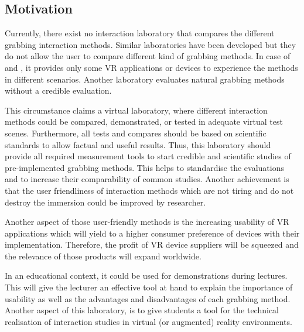 \subsection{Motivation}\label{sec:Motivation}

Currently, there exist no interaction laboratory that compares the different grabbing interaction methods. Similar laboratories \cite{lin2016towards}\cite{website:TU}\cite{website:steam} have been developed but they do not allow the user to compare different kind of grabbing methods. In case of \cite{website:steam} and \cite{website:TU}, it provides only some VR applications or devices to experience the methods in different scenarios. Another \cite{lin2016towards} laboratory evaluates natural grabbing methods without a credible evaluation.
  
This circumstance claims a virtual laboratory, where different interaction methods could be compared, demonstrated, or tested in adequate virtual test scenes. Furthermore, all tests and compares should be based on scientific standards to allow factual and useful results. Thus, this laboratory should provide all required measurement tools to start credible and scientific studies of pre-implemented grabbing methods. This helps to standardise the evaluations and to increase their comparability of common studies. Another achievement is that the user friendliness of interaction methods which are not tiring and do not destroy the immersion could be improved by researcher. 

Another aspect of those user-friendly methods is the increasing usability of VR applications which will yield to a higher consumer preference of devices with their implementation. Therefore, the profit of VR device suppliers will be squeezed and the relevance of those products will expand worldwide. 

In an educational context, it could be used for demonstrations during lectures. This will give the lecturer an effective tool at hand to explain the importance of usability as well as the advantages and disadvantages of each grabbing method. Another aspect of this laboratory, is to give students a tool for the technical realisation of interaction studies in virtual (or augmented) reality environments.

